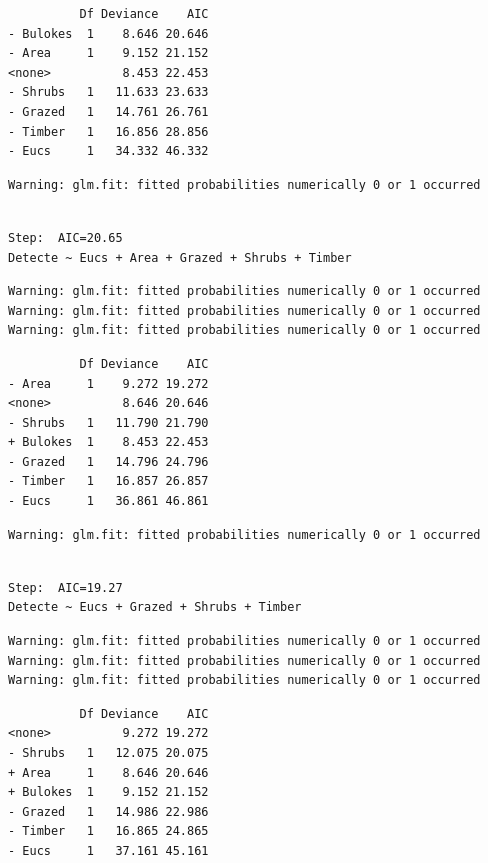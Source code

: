 \documentclass[
  french,
  letterpaper,
  DIV=11,
  numbers=noendperiod]{scrreprt}
\newcounter{none} %
\begin{document}
\begin{verbatim}
          Df Deviance    AIC
- Bulokes  1    8.646 20.646
- Area     1    9.152 21.152
<none>          8.453 22.453
- Shrubs   1   11.633 23.633
- Grazed   1   14.761 26.761
- Timber   1   16.856 28.856
- Eucs     1   34.332 46.332
\end{verbatim}

\begin{verbatim}
Warning: glm.fit: fitted probabilities numerically 0 or 1 occurred
\end{verbatim}

\begin{verbatim}

Step:  AIC=20.65
Detecte ~ Eucs + Area + Grazed + Shrubs + Timber
\end{verbatim}

\begin{verbatim}
Warning: glm.fit: fitted probabilities numerically 0 or 1 occurred
Warning: glm.fit: fitted probabilities numerically 0 or 1 occurred
Warning: glm.fit: fitted probabilities numerically 0 or 1 occurred
\end{verbatim}

\begin{verbatim}
          Df Deviance    AIC
- Area     1    9.272 19.272
<none>          8.646 20.646
- Shrubs   1   11.790 21.790
+ Bulokes  1    8.453 22.453
- Grazed   1   14.796 24.796
- Timber   1   16.857 26.857
- Eucs     1   36.861 46.861
\end{verbatim}

\begin{verbatim}
Warning: glm.fit: fitted probabilities numerically 0 or 1 occurred
\end{verbatim}

\begin{verbatim}

Step:  AIC=19.27
Detecte ~ Eucs + Grazed + Shrubs + Timber
\end{verbatim}

\begin{verbatim}
Warning: glm.fit: fitted probabilities numerically 0 or 1 occurred
Warning: glm.fit: fitted probabilities numerically 0 or 1 occurred
Warning: glm.fit: fitted probabilities numerically 0 or 1 occurred
\end{verbatim}

\begin{verbatim}
          Df Deviance    AIC
<none>          9.272 19.272
- Shrubs   1   12.075 20.075
+ Area     1    8.646 20.646
+ Bulokes  1    9.152 21.152
- Grazed   1   14.986 22.986
- Timber   1   16.865 24.865
- Eucs     1   37.161 45.161
\end{verbatim}
\end{document}
